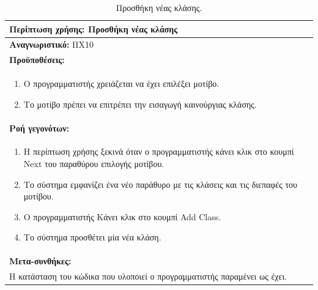 \begin{table}[H]
	\hspace*{-0.2cm}
    \centering
    \scriptsize
	\begin{tabular}{|p{10cm}|}
	\hline
		\textbf{Περίπτωση χρήσης:} Προσθήκη νέας κλάσης  \\
	\hline
		\textbf{Αναγνωριστικό:} ΠΧ10 \\
	\hline	
		\textbf{Προϋποθέσεις:} \\
		\begin{enumerate}
		 \item Ο προγραμματιστής χρειάζεται να έχει επιλέξει μοτίβο.
		 \item Το μοτίβο πρέπει να επιτρέπει την εισαγωγή καινούργιας κλάσης.
		\end{enumerate} \\
	\hline
		\textbf{Ροή γεγονότων:} \\
		\begin{enumerate}
			\item Η περίπτωση χρήσης ξεκινά όταν ο προγραμματιστής κάνει κλικ στο κουμπί Next του παραθύρου επιλογής μοτίβου.
			\item Το σύστημα εμφανίζει ένα νέο παράθυρο με τις κλάσεις και τις διεπαφές του μοτίβου.
			\item Ο προγραμματιστής Κάνει κλικ στο κουμπί Add Class.
			\item Το σύστημα προσθέτει μία νέα κλάση.
			
		\end{enumerate} \\
	\hline
		\textbf{Μετα-συνθήκες:} \\ Η κατάσταση του κώδικα που υλοποιεί ο προγραμματιστής παραμένει ως έχει. \\
	\hline
    \end{tabular}
    \caption{Προσθήκη νέας κλάσης.}
    \label{tab:addNewClass}
\end{table}
